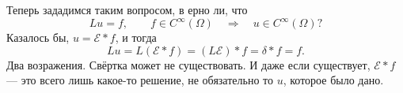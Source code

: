 \documentclass[12pt,a4paper]{article}
\begin{document}


Теперь зададимся таким вопросом, в    ерно ли, что
\[
Lu=f,\qquad f\in C^\infty(\Omega)
\quad\Rightarrow\quad
u\in C^\infty(\Omega)?
\]
Казалось бы, \(u=\mathcal{E}*f\), и тогда
\[
Lu
=
L(\mathcal{E}*f)
=
(L\mathcal{E})*f
=
\delta*f
=f.
\]
Два возражения. Свёртка может не существовать.
И даже если существует, \(\mathcal{E}*f\) --- это всего лишь какое-то решение,
не обязательно то \(u\), которое было дано.


\prf{
\[
Lu*\mathcal{E}
=
u*(L\mathcal{E})
=
u*\delta
=u.
\]
}

\end{document}
